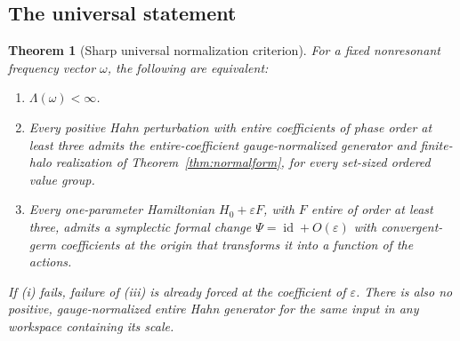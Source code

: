 \documentclass[11pt,letterpaper]{article}
\numberwithin{equation}{section}
\newtheorem{theorem}{Theorem}[section]
\theoremstyle{definition}
\theoremstyle{remark}
\newcommand{\id}{\operatorname{id}}
\begin{document}
\subsection{The universal statement}
\begin{theorem}[Sharp universal normalization criterion]\label{thm:universal}
For a fixed nonresonant frequency vector $\omega$, the following are
equivalent:
\begin{enumerate}[label=(\roman*)]
\item $\Lambda(\omega)<\infty$.
\item Every positive Hahn perturbation with entire coefficients of phase
order at least three admits the entire-coefficient gauge-normalized
generator and finite-halo realization of Theorem~\ref{thm:normalform}, for
every set-sized ordered value group.
\item Every one-parameter Hamiltonian $H_0+\varepsilon F$, with $F$ entire
of order at least three, admits a symplectic formal change
$\Psi=\id+O(\varepsilon)$ with convergent-germ coefficients at the origin
that transforms it into a function of the actions.
\end{enumerate}
If (i) fails, failure of (iii) is already forced at the coefficient of
$\varepsilon$. There is also no positive, gauge-normalized entire Hahn
generator for the same input in any workspace containing its scale.
\end{theorem}
\end{document}
